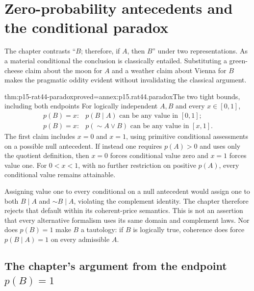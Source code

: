 \section{Zero-probability antecedents and the conditional paradox}

The chapter contrasts ``\(B\); therefore, if \(A\), then \(B\)''
under two representations. As a material conditional the conclusion is
classically entailed. Substituting a green-cheese claim about the moon
for \(A\) and a weather claim about Vienna for \(B\) makes the
pragmatic oddity evident without invalidating the classical argument.

\begin{hbtheorem}{thm:p15-rat44-paradox}{proved=annex:p15.rat44.paradox}{The two tight bounds, including both endpoints}
For logically independent \(A,B\) and every \(x\in[0,1]\),
\[
 \begin{array}{ll}
 p(B)=x:& p(B\mid A)\text{ can be any value in }[0,1];\\
 p(B)=x:& p(\sim A\lor B)\text{ can be any value in }[x,1].
 \end{array}
\]
The first claim includes \(x=0\) and \(x=1\), using primitive
conditional assessments on a possible null antecedent. If instead one
requires \(p(A)>0\) and uses only the quotient definition, then
\(x=0\) forces conditional value zero and \(x=1\) forces value one.
For \(0<x<1\), with no further restriction on positive \(p(A)\),
every conditional value remains attainable.
\end{hbtheorem}

Assigning value one to every conditional on a null antecedent would
assign one to both \(B\mid A\) and \(\sim B\mid A\), violating
the complement identity. The chapter therefore rejects that default
within its coherent-price semantics. This is not an assertion that
every alternative formalism uses its same domain and complement laws.
Nor does \(p(B)=1\) make \(B\) a tautology: if \(B\) is logically
true, coherence does force \(p(B\mid A)=1\) on every admissible \(A\).

\subsection{The chapter's argument from the endpoint \(p(B)=1\)}
\label{sec:p15-w02b-p15-038-endpoint-argument}

